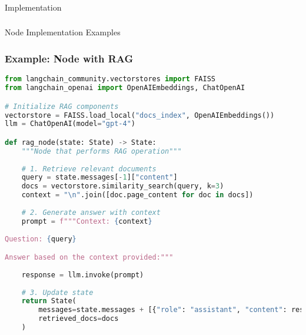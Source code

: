 \begin{frame}[fragile]\frametitle{}
\begin{center}
{\Large Implementation}
\end{center}
\end{frame}

\begin{frame}[fragile]\frametitle{}
\begin{center}
{\Large Node Implementation Examples}
\end{center}
\end{frame}

\begin{frame}[fragile]\frametitle{Example: Node with RAG}
      \begin{lstlisting}[language=Python, basicstyle=\tiny]
from langchain_community.vectorstores import FAISS
from langchain_openai import OpenAIEmbeddings, ChatOpenAI

# Initialize RAG components
vectorstore = FAISS.load_local("docs_index", OpenAIEmbeddings())
llm = ChatOpenAI(model="gpt-4")

def rag_node(state: State) -> State:
    """Node that performs RAG operation"""
    
    # 1. Retrieve relevant documents
    query = state.messages[-1]["content"]
    docs = vectorstore.similarity_search(query, k=3)
    context = "\n".join([doc.page_content for doc in docs])
    
    # 2. Generate answer with context
    prompt = f"""Context: {context}
    
Question: {query}

Answer based on the context provided:"""
    
    response = llm.invoke(prompt)
    
    # 3. Update state
    return State(
        messages=state.messages + [{"role": "assistant", "content": response.content}],
        retrieved_docs=docs
    )
      \end{lstlisting}
\end{frame}

